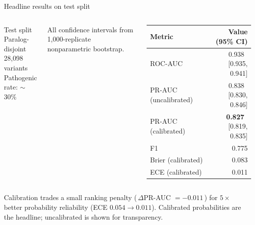 \begin{frame}{Headline results on test split}
  \begin{columns}[T]
    \begin{block}{Test split}
      Paralog-disjoint\\
      28{,}098 variants\\
      Pathogenic rate: $\sim$30\%
    \end{block}

    \footnotesize
    All confidence intervals from 1{,}000-replicate nonparametric bootstrap.

    \centering
    \begin{tabular}{@{}lr@{}}
      \toprule
      \textbf{Metric}              & \textbf{Value (95\% CI)} \\
      \midrule
      ROC-AUC                      & 0.938 \,[0.935, 0.941]   \\
      PR-AUC (uncalibrated)        & 0.838 \,[0.830, 0.846]   \\
      \rowcolor{kkugold!20}
      PR-AUC (calibrated)          & \textbf{0.827} \,[0.819, 0.835] \\
      F1                           & 0.775                    \\
      Brier (calibrated)           & 0.083                    \\
      ECE (calibrated)             & 0.011                    \\
      \bottomrule
    \end{tabular}
  \end{columns}

  \vspace{0.7em}
  \footnotesize
  Calibration trades a small ranking penalty (\,$\Delta$PR-AUC $= -0.011$\,)
  for $5{\times}$ better probability reliability (ECE $0.054 \to 0.011$).
  Calibrated probabilities are the headline; uncalibrated is shown for transparency.
\end{frame}



